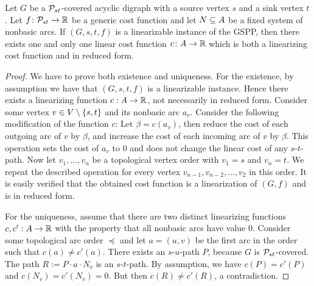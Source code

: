 \begin{lemma}
\label{lemma:nonbasic-arcs}
Let $G$ be a $\mathcal{P}_{st}$-covered acyclic digraph with a source vertex $s$ and a sink vertex $t$. Let  $f\colon  \mathcal{P}_{st} \rightarrow \mathbb{R}$ be a generic cost function and  let $N \subseteq A$ be a fixed system of nonbasic arcs. If  $(G,s,t,f)$ is a linearizable instance of the GSPP, then there exists one and only one linear cost function $c\colon A \rightarrow \mathbb{R}$ which is both a linearizing cost function  and in reduced form.
\end{lemma}
\begin{proof}
    We have to prove both existence and uniqueness. For the existence, by assumption we have that $(G,s,t,f)$ is a linearizable instance. Hence there exists a linearizing function $c : A \rightarrow \mathbb{R}$, not necessarily in reduced form. Consider some vertex $v \in V \setminus \{ s,t \}$ and its nonbasic arc $a_v$. Consider the following modification of the function $c$: Let $\beta = c(a_v)$, then reduce the cost of each outgoing arc of $v$ by $\beta$, and increase the cost of each incoming arc of $v$ by $\beta$. This operation sets the cost of $a_v$ to $0$ and does not change the linear cost of any $s$-$t$-path. Now let $v_1,\dots,v_n$ be a topological vertex order with $v_1 = s$ and $v_n = t$. We repeat the described operation for every vertex $v_{n-1}, v_{n-2}, \dots, v_2$  in this order. It is easily verified that the obtained cost function is a linearization of $(G, f)$ and is in reduced form.
    
    For the uniqueness, assume that there are two distinct linearizing functions $c, c' : A \rightarrow \mathbb{R}$ with the property that all nonbasic arcs have value 0. Consider some topological arc order $\preceq$ and let $a = (u,v)$ be the first arc in the order such that $c(a) \neq c'(a)$. There exists an $s$-$u$-path $P$, because $G$ is $\mathcal{P}_{st}$-covered. The path $R := P \cdot a \cdot N_v$ is an $s$-$t$-path. By assumption, we have $c(P) = c'(P)$ and $c(N_v) = c'(N_v) = 0$. But then $c(R) \neq c'(R)$, a contradiction. 
     
\end{proof}


